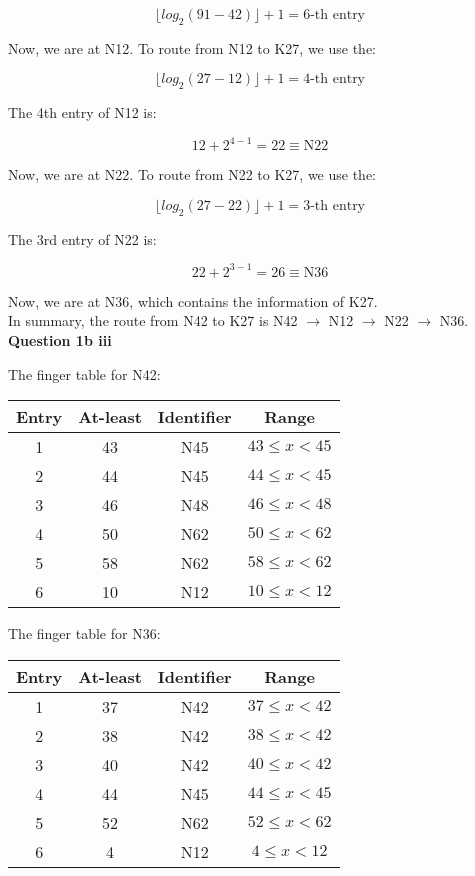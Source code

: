 \documentclass[11pt,a4paper]{report}
\begin{document}
\begin{multicols*}{2}
$$\lfloor log_2(91-42) \rfloor + 1 = 6\text{-th entry}$$

\noindent Now, we are at N12. To route from N12 to K27, we use the:

$$\lfloor log_2(27-12) \rfloor + 1 = 4\text{-th entry}$$

\noindent The 4th entry of N12 is:

$$12 + 2^{4-1} = 22 \equiv \text{N22}$$

\noindent Now, we are at N22. To route from N22 to K27, we use the:

$$\lfloor log_2(27-22) \rfloor + 1 = 3\text{-th entry}$$

\noindent The 3rd entry of N22 is:

$$22 + 2^{3-1} = 26 \equiv \text{N36}$$

\noindent Now, we are at N36, which contains the information of K27. \\

\noindent In summary, the route from N42 to K27 is N42 $\rightarrow$ N12 $\rightarrow$ N22 $\rightarrow$ N36.\\

\noindent \textbf{Question 1b iii}

\noindent The finger table for N42:

\begin{center}
\begin{tabular}{|c|c|c|c|}
  \hline
  Entry & At-least & Identifier & Range\\ \hline
  1     & 43       & N45        & $43\le x <45$\\
  2     & 44       & N45        & $44\le x <45$\\
  3     & 46       & N48        & $46\le x <48$\\
  4     & 50       & N62        & $50\le x <62$\\
  5     & 58       & N62        & $58\le x <62$\\
  6     & 10       & N12        & $10\le x <12$\\ \hline
\end{tabular}
\end{center}

\noindent The finger table for N36:

\begin{center}
\begin{tabular}{|c|c|c|c|}
  \hline
  Entry & At-least & Identifier & Range\\ \hline
  1     & 37       & N42        & $37\le x <42$\\
  2     & 38       & N42        & $38\le x <42$\\
  3     & 40       & N42        & $40\le x <42$\\
  4     & 44       & N45        & $44\le x <45$\\
  5     & 52       & N62        & $52\le x <62$\\
  6     & 4        & N12        & $4 \le x <12$\\ \hline
\end{tabular}
\end{center}


\end{multicols*}
\end{document}
